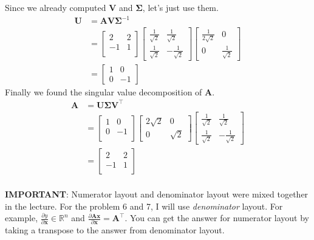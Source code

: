 \documentclass[11pt]{article}
\begin{document}
\begin{enumerate}
Since we already computed $\bm V$ and $\bm \Sigma$, let's just use them.
\begin{align*}
\bm U & =\bm{AV\Sigma}^{-1} \\
& =\begin{bmatrix}2&2\\-1&1\\\end{bmatrix}
\begin{bmatrix}\frac{1}{\sqrt{2}}&\frac{1}{\sqrt{2}}\\
                        \frac{1}{\sqrt{2}}&-\frac{1}{\sqrt{2}}\end{bmatrix}
\begin{bmatrix}\frac{1}{2\sqrt{2}}&0\\0&\frac{1}{\sqrt{2}}\end{bmatrix} \\
& =\begin{bmatrix}1&0\\0&-1\end{bmatrix}
\end{align*}
Finally we found the singular value decomposition of $\bm A$.
\begin{align*}
\bm A & =\bm{U\Sigma V}^{\top} \\
& =\begin{bmatrix}1&0\\0&-1\\\end{bmatrix}
\begin{bmatrix}2\sqrt{2}&0\\0&\sqrt{2}\end{bmatrix}
\begin{bmatrix}\frac{1}{\sqrt{2}}&\frac{1}{\sqrt{2}}\\
               \frac{1}{\sqrt{2}}&-\frac{1}{\sqrt{2}}\end{bmatrix} \\
& =\begin{bmatrix}2&2\\-1&1\\\end{bmatrix}
\end{align*} \\

\textbf{IMPORTANT}:
Numerator layout and denominator layout were mixed together in the lecture.
For the problem 6 and 7, I will use \textit{denominator} layout.
For example,
$\frac{\partial y}{\partial\bm x}\in\mathbb{R}^{n}$ and
$\frac{\partial\bm{Ax}}{\partial\bm x}=\bm A^{\top}$.
You can get the answer for numerator layout by taking a transpose to the answer from denominator layout.


\end{enumerate}
\end{document}
